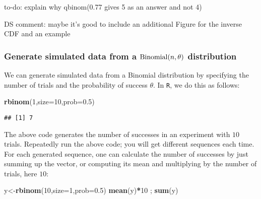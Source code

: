 \documentclass[12pt,]{krantz}
\newenvironment{Shaded}{\begin{snugshade}}{\end{snugshade}}
\newcommand{\DataTypeTok}[1]{\textcolor[rgb]{0.13,0.29,0.53}{#1}}
\newcommand{\DecValTok}[1]{\textcolor[rgb]{0.00,0.00,0.81}{#1}}
\newcommand{\FloatTok}[1]{\textcolor[rgb]{0.00,0.00,0.81}{#1}}
\newcommand{\KeywordTok}[1]{\textcolor[rgb]{0.13,0.29,0.53}{\textbf{#1}}}
\newcommand{\NormalTok}[1]{#1}
\newcommand{\OperatorTok}[1]{\textcolor[rgb]{0.81,0.36,0.00}{\textbf{#1}}}
\let\BeginKnitrBlock\begin \let\EndKnitrBlock\end
\begin{document}
\BeginKnitrBlock{rmdnote}
to-do: explain why qbinom(0.77 gives 5 as an answer and not 4)
\EndKnitrBlock{rmdnote}

\BeginKnitrBlock{rmdnote}
DS comment: maybe it's good to include an additional Figure for the inverse CDF and an example
\EndKnitrBlock{rmdnote}

\hypertarget{generate-simulated-data-from-a-hboxbinomialntheta-distribution}{%
\subsubsection{\texorpdfstring{Generate simulated data from a \(\hbox{Binomial}(n,\theta)\) distribution}{Generate simulated data from a \textbackslash{}hbox\{Binomial\}(n,\textbackslash{}theta) distribution}}\label{generate-simulated-data-from-a-hboxbinomialntheta-distribution}}

We can generate simulated data from a Binomial distribution by specifying the number of trials and the probability of success \(\theta\). In \texttt{R}, we do this as follows:

\begin{Shaded}
\begin{Highlighting}[]
\KeywordTok{rbinom}\NormalTok{(}\DecValTok{1}\NormalTok{,}\DataTypeTok{size=}\DecValTok{10}\NormalTok{,}\DataTypeTok{prob=}\FloatTok{0.5}\NormalTok{)}
\end{Highlighting}
\end{Shaded}

\begin{verbatim}
## [1] 7
\end{verbatim}

The above code generates the number of successes in an experiment with \(10\) trials. Repeatedly run the above code; you will get different sequences each time. For each generated sequence, one can calculate the number of successes by just summing up the vector, or computing its mean and multiplying by the number of trials, here \(10\):

\begin{Shaded}
\begin{Highlighting}[]
\NormalTok{y<-}\KeywordTok{rbinom}\NormalTok{(}\DecValTok{10}\NormalTok{,}\DataTypeTok{size=}\DecValTok{1}\NormalTok{,}\DataTypeTok{prob=}\FloatTok{0.5}\NormalTok{)}
\KeywordTok{mean}\NormalTok{(y)}\OperatorTok{*}\DecValTok{10}\NormalTok{ ; }\KeywordTok{sum}\NormalTok{(y)}
\end{Highlighting}
\end{Shaded}
\end{document}
